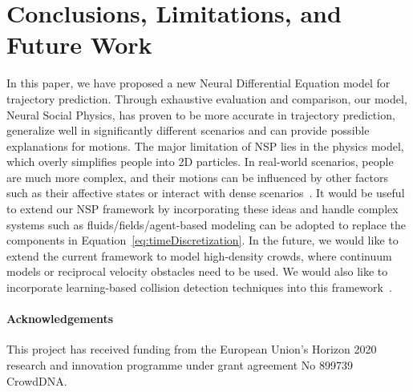 \documentclass[runningheads]{llncs}
\newcommand{\Eqnref}[1]{Equation~\ref{eq:#1}}
\begin{document}
\section{Conclusions, Limitations, and Future Work}


In this paper, we have proposed a new Neural Differential Equation model for trajectory prediction. Through exhaustive evaluation and comparison, our model, Neural Social Physics, has proven to be more accurate in trajectory prediction, generalize well in significantly different scenarios and can provide possible explanations for motions. The major limitation of NSP lies in the physics model, which overly simplifies people into 2D particles. In real-world scenarios, people are much more complex, and their motions can be influenced by other factors such as their affective states or interact with dense scenarios~\cite{bera2014realtime,bera2017aggressive}. It would be useful to extend our NSP framework by incorporating these ideas and handle complex  systems such as fluids/fields/agent-based modeling can be adopted to replace the components in \Eqnref{timeDiscretization}. In the future, we would like to extend the current framework to model high-density crowds, where continuum models or reciprocal  velocity obstacles need to be used. We would also like to incorporate learning-based collision detection techniques into this framework~\cite{tan2021lcollision,tan2022n}.

\paragraph{Acknowledgements} This project has received funding from the European Union’s Horizon 2020 research and innovation programme under grant agreement No 899739 CrowdDNA.

 


\end{document}
